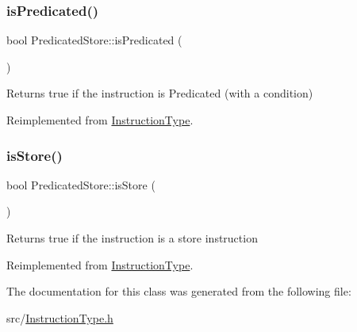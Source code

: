 \subsubsection{\texorpdfstring{is\+Predicated()}{isPredicated()}}
{\footnotesize\ttfamily bool Predicated\+Store\+::is\+Predicated (\begin{DoxyParamCaption}{ }\end{DoxyParamCaption})\hspace{0.3cm}{\ttfamily [virtual]}}

Returns true if the instruction is Predicated (with a condition) 

Reimplemented from \hyperlink{classInstructionType_a5b28d5b2e495222817facca7b8826975}{Instruction\+Type}.

\mbox{\label{classPredicatedStore_ada88354c4a4838c8ff5fa7b225f8a751}} 
\subsubsection{\texorpdfstring{is\+Store()}{isStore()}}
{\footnotesize\ttfamily bool Predicated\+Store\+::is\+Store (\begin{DoxyParamCaption}{ }\end{DoxyParamCaption})\hspace{0.3cm}{\ttfamily [virtual]}}

Returns true if the instruction is a store instruction 

Reimplemented from \hyperlink{classInstructionType_aa81de3619fb9d88f52d7d8104f9ac188}{Instruction\+Type}.



The documentation for this class was generated from the following file\+:\begin{DoxyCompactItemize}
\item 
src/\hyperlink{InstructionType_8h}{Instruction\+Type.\+h}\end{DoxyCompactItemize}
